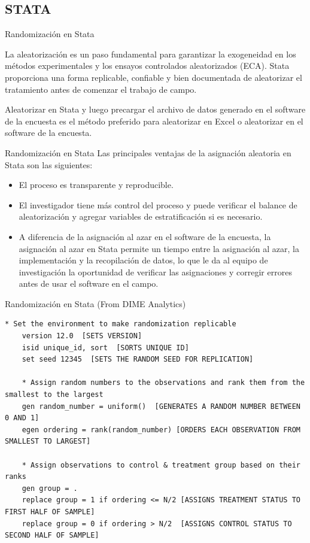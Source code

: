 \documentclass[11pt, aspectratio=169, compress]{beamer}
\begin{document}
\subsection{STATA}
\begin{frame}{Randomización en Stata}
  
  La aleatorización es un paso fundamental para garantizar la exogeneidad en los métodos experimentales y los ensayos controlados aleatorizados (ECA). Stata proporciona una forma replicable, confiable y bien documentada de aleatorizar el tratamiento antes de comenzar el trabajo de campo.

  Aleatorizar en Stata y luego precargar el archivo de datos generado en el software de la encuesta es el método preferido para aleatorizar en Excel o aleatorizar en el software de la encuesta. 
\end{frame}
\begin{frame}{Randomización en Stata}
  Las principales ventajas de la asignación aleatoria en Stata son las siguientes:

  \begin{itemize}
    \item El proceso es transparente y reproducible.
    \item El investigador tiene más control del proceso y puede verificar el balance de aleatorización y agregar variables de estratificación si es necesario.
    \item A diferencia de la asignación al azar en el software de la encuesta, la asignación al azar en Stata permite un tiempo entre la asignación al azar, la implementación y la recopilación de datos, lo que le da al equipo de investigación la oportunidad de verificar las asignaciones y corregir errores antes de usar el software en el campo.
  \end{itemize}
\end{frame}
\begin{frame}[fragile]{Randomización en Stata (From DIME Analytics)}
  
  \begin{lstlisting}[basicstyle=\tiny]
    * Set the environment to make randomization replicable
    version 12.0  [SETS VERSION] 
    isid unique_id, sort  [SORTS UNIQUE ID]  
    set seed 12345  [SETS THE RANDOM SEED FOR REPLICATION]  
    
    * Assign random numbers to the observations and rank them from the smallest to the largest
    gen random_number = uniform()  [GENERATES A RANDOM NUMBER BETWEEN 0 AND 1] 
    egen ordering = rank(random_number) [ORDERS EACH OBSERVATION FROM SMALLEST TO LARGEST] 
    
    * Assign observations to control & treatment group based on their ranks 
    gen group = .  
    replace group = 1 if ordering <= N/2 [ASSIGNS TREATMENT STATUS TO FIRST HALF OF SAMPLE]  
    replace group = 0 if ordering > N/2  [ASSIGNS CONTROL STATUS TO SECOND HALF OF SAMPLE]
  \end{lstlisting}
  
\end{frame}
\end{document}
